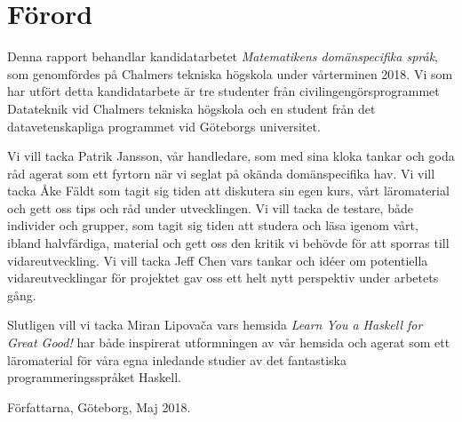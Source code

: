 \thispagestyle{plain}			%
\section*{Förord}

Denna rapport behandlar kandidatarbetet \textit{Matematikens domänspecifika språk},
som genomfördes på Chalmers tekniska högskola under vårterminen 2018. Vi som har
utfört detta kandidatarbete är tre studenter från civilingengörsprogrammet
Datateknik vid Chalmers tekniska högskola och en student från det
datavetenskapliga programmet vid Göteborgs universitet.

Vi vill tacka Patrik Jansson, vår handledare, som med sina kloka tankar och goda
råd agerat som ett fyrtorn när vi seglat på okända domänspecifika hav. Vi vill
tacka Åke Fäldt som tagit sig tiden att diskutera sin egen kurs, vårt
läromaterial och gett oss tips och råd under utvecklingen. Vi vill tacka de
testare, både individer och grupper, som tagit sig tiden att studera och läsa
igenom vårt, ibland halvfärdiga, material och gett oss den kritik vi behövde för
att sporras till vidareutveckling. Vi vill tacka Jeff Chen vars tankar och idéer
om potentiella vidareutvecklingar för projektet gav oss ett helt nytt perspektiv
under arbetets gång.

Slutligen vill vi tacka Miran Lipovača vars hemsida \textit{Learn You a
Haskell for Great Good!} har både inspirerat utformningen av vår hemsida och
agerat som ett läromaterial för våra egna inledande studier av det fantastiska
programmeringsspråket Haskell. 

\vspace{1.5cm}
\hfill
Författarna, Göteborg, Maj 2018.

\newpage				%
\thispagestyle{empty}
\mbox{}
